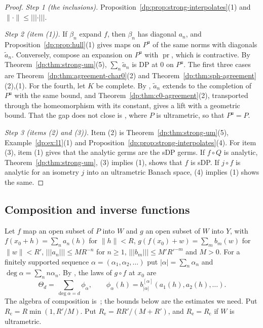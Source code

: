 \documentclass[11pt]{amsart}
\theoremstyle{definition}
\theoremstyle{remark}
\numberwithin{equation}{section}
\newcommand{\abs}[1]{\lvert #1\rvert}
\newcommand{\norm}[1]{\lVert #1\rVert}
\theoremstyle{plain}
\theoremstyle{definition}
\theoremstyle{plain}
\begin{document}
\begin{proof}
\emph{Step 1 (the inclusions).} Proposition~\ref{dp:prop:strong-interpolates}(1) and $\norm\cdot\le\lvert\!\lvert\!\lvert \cdot\rvert\!\rvert\!\rvert$.

\emph{Step 2 (item (1)).} If $\beta_n$ expand $f$, then $\beta_n$ has diagonal $a_n$, and Proposition~\ref{dp:prop:hull}(1) gives maps on $P^{\mathsf u}$ of the same norms with diagonals $\tilde a_n$. Conversely, compose an expansion on $P^{\mathsf u}$ with $\operatorname{pr}$, which is contractive. By Theorem~\ref{dp:thm:strong-um}(5), $\sum_n\tilde a_n$ is DP at $0$ on $P^{\mathsf u}$. The first three cases are Theorem~\ref{dp:thm:agreement-char0}(2) and Theorem~\ref{dp:thm:sph-agreement}(2),(1). For the fourth, let $K$ be complete. By \cite[Lemma~Q.13(1)]{I}, $\tilde a_n$ extends to the completion of $P^{\mathsf u}$ with the same bound, and Theorem~\ref{dp:thm:c0-agreement}(2), transported through the homeomorphism with its constant, gives a lift with a geometric bound. That the gap does not close is \cite[Proposition~14.40(3)]{I}, where $P$ is ultrametric, so that $P^{\mathsf u}=P$.

\emph{Step 3 (items (2) and (3)).} Item (2) is Theorem~\ref{dp:thm:strong-um}(5), Example~\ref{dp:ex:l1}(1) and Proposition~\ref{dp:prop:strong-interpolates}(4). For item (3), item (1) gives that the analytic germs are the sDP germs. If $f\circ Q$ is analytic, Theorem~\ref{dp:thm:strong-um}, (3) implies (1), shows that $f$ is sDP. If $j\circ f$ is analytic for an isometry $j$ into an ultrametric Banach space, (4) implies (1) shows the same.
\end{proof}

\subsection{Composition and inverse functions}\label{dp:s:ssec-composition}

Let $f$ map an open subset of $P$ into $W$ and $g$ an open subset of $W$ into $Y$, with $f(x_0+h)=\sum_na_n(h)$ for $\norm h<R$, $g(f(x_0)+w)=\sum_mb_m(w)$ for $\norm w<R'$, $\lvert\!\lvert\!\lvert a_n\rvert\!\rvert\!\rvert\le MR^{-n}$ for $n\ge1$, $\lvert\!\lvert\!\lvert b_m\rvert\!\rvert\!\rvert\le M'R'^{-m}$ and $M>0$. For a finitely supported sequence $\alpha=(\alpha_1,\alpha_2,\dots)$ put $\abs\alpha=\sum_n\alpha_n$ and $\deg\alpha=\sum_nn\alpha_n$. By \cite[Lemma~Q.3]{I}, the laws of $g\circ f$ at $x_0$ are
\[
 \Theta_d=\sum_{\deg\alpha=d}\phi_\alpha,\qquad\phi_\alpha(h)=b_{\abs\alpha}^{[\alpha]}(a_1(h),a_2(h),\dots).
\]
The algebra of composition is~\cite[VI~\S8, Prop.~VI.6, Cor.; Prop.~I.2; II~\S1]{Ro}; the bounds below are the estimates we need. Put $R_{\mathrm c}=R\min(1,R'/M)$. Put $R_{\mathrm e}=RR'/(M+R')$, and $R_{\mathrm e}=R_{\mathrm c}$ if $W$ is ultrametric.
\end{document}
